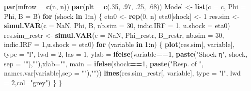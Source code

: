 \documentclass[
  11pt,
]{book}
\newenvironment{Shaded}{\begin{snugshade}}{\end{snugshade}}
\newcommand{\AttributeTok}[1]{\textcolor[rgb]{0.13,0.29,0.53}{#1}}
\newcommand{\ConstantTok}[1]{\textcolor[rgb]{0.56,0.35,0.01}{#1}}
\newcommand{\ControlFlowTok}[1]{\textcolor[rgb]{0.13,0.29,0.53}{\textbf{#1}}}
\newcommand{\DecValTok}[1]{\textcolor[rgb]{0.00,0.00,0.81}{#1}}
\newcommand{\FunctionTok}[1]{\textcolor[rgb]{0.13,0.29,0.53}{\textbf{#1}}}
\newcommand{\NormalTok}[1]{#1}
\newcommand{\OtherTok}[1]{\textcolor[rgb]{0.56,0.35,0.01}{#1}}
\newcommand{\SpecialCharTok}[1]{\textcolor[rgb]{0.81,0.36,0.00}{\textbf{#1}}}
\newcommand{\StringTok}[1]{\textcolor[rgb]{0.31,0.60,0.02}{#1}}
\theoremstyle{definition}
\theoremstyle{definition}
\theoremstyle{definition}
\theoremstyle{definition}
\theoremstyle{remark}
\begin{document}
\begin{Shaded}
\begin{Highlighting}[]
\FunctionTok{par}\NormalTok{(}\AttributeTok{mfrow =} \FunctionTok{c}\NormalTok{(n, n))}
\FunctionTok{par}\NormalTok{(}\AttributeTok{plt =} \FunctionTok{c}\NormalTok{(.}\DecValTok{35}\NormalTok{, .}\DecValTok{97}\NormalTok{, .}\DecValTok{25}\NormalTok{, .}\DecValTok{68}\NormalTok{))}
\NormalTok{Model }\OtherTok{\textless{}{-}} \FunctionTok{list}\NormalTok{(}\AttributeTok{c =}\NormalTok{ c, }\AttributeTok{Phi =}\NormalTok{ Phi, }\AttributeTok{B =}\NormalTok{ B)}
\ControlFlowTok{for}\NormalTok{ (shock }\ControlFlowTok{in} \DecValTok{1}\SpecialCharTok{:}\NormalTok{n) \{}
\NormalTok{  eta0 }\OtherTok{\textless{}{-}} \FunctionTok{rep}\NormalTok{(}\DecValTok{0}\NormalTok{, n)}
\NormalTok{  eta0[shock] }\OtherTok{\textless{}{-}} \DecValTok{1}
\NormalTok{  res.sim }\OtherTok{\textless{}{-}} \FunctionTok{simul.VAR}\NormalTok{(}\AttributeTok{c =} \ConstantTok{NaN}\NormalTok{, Phi, B, }\AttributeTok{nb.sim =} \DecValTok{30}\NormalTok{, }\AttributeTok{indic.IRF =} \DecValTok{1}\NormalTok{,}
                       \AttributeTok{u.shock =}\NormalTok{ eta0)}
\NormalTok{  res.sim\_restr }\OtherTok{\textless{}{-}} \FunctionTok{simul.VAR}\NormalTok{(}\AttributeTok{c =} \ConstantTok{NaN}\NormalTok{, Phi\_restr, B\_restr, }\AttributeTok{nb.sim =} \DecValTok{30}\NormalTok{,}
                             \AttributeTok{indic.IRF =} \DecValTok{1}\NormalTok{,}\AttributeTok{u.shock =}\NormalTok{ eta0)}
  \ControlFlowTok{for}\NormalTok{ (variable }\ControlFlowTok{in} \DecValTok{1}\SpecialCharTok{:}\NormalTok{n) \{}
    \FunctionTok{plot}\NormalTok{(res.sim[, variable], }\AttributeTok{type =} \StringTok{"l"}\NormalTok{, }\AttributeTok{lwd =} \DecValTok{2}\NormalTok{, }\AttributeTok{las =} \DecValTok{1}\NormalTok{,}
         \AttributeTok{ylab =} \FunctionTok{ifelse}\NormalTok{(variable}\SpecialCharTok{==}\DecValTok{1}\NormalTok{,}
                       \FunctionTok{paste}\NormalTok{(}\StringTok{"Shock η"}\NormalTok{, shock, }\AttributeTok{sep =} \StringTok{""}\NormalTok{),}\StringTok{""}\NormalTok{),}\AttributeTok{xlab=}\StringTok{""}\NormalTok{,}
         \AttributeTok{main =} \FunctionTok{ifelse}\NormalTok{(shock}\SpecialCharTok{==}\DecValTok{1}\NormalTok{,}
                       \FunctionTok{paste}\NormalTok{(}\StringTok{"Resp. of "}\NormalTok{, names.var[variable],}\AttributeTok{sep =} \StringTok{""}\NormalTok{),}\StringTok{""}\NormalTok{))}
    \FunctionTok{lines}\NormalTok{(res.sim\_restr[, variable], }\AttributeTok{type =} \StringTok{"l"}\NormalTok{, }\AttributeTok{lwd =} \DecValTok{2}\NormalTok{,}\AttributeTok{col=}\StringTok{"grey"}\NormalTok{)}
\NormalTok{  \}}
\NormalTok{\}}
\end{Highlighting}
\end{Shaded}
\end{document}

